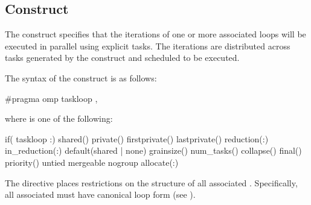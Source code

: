 \subsection{ Construct}
\label{subsec:taskloop Construct}
\summary
The  construct specifies that the iterations of one or more associated loops will be executed in parallel using explicit tasks. The iterations are distributed across tasks generated by the construct and scheduled to be executed.
\syntax
\begin{ccppspecific}
The syntax of the  construct is as follows:
\begin{ompcPragma}
#pragma omp taskloop \plc{[clause[[},\plc{] clause] ...] new-line}
\end{ompcPragma}
where  is one of the following:
\begin{indentedcodelist}
if(\plc{[} taskloop :\plc{] scalar-expression})
shared()
private()
firstprivate()
lastprivate()
reduction(:)
in_reduction(:)
default(shared \textnormal{|} none)
grainsize()
num_tasks()
collapse()
final()
priority()
untied
mergeable
nogroup
allocate(\plc{[allocator }:\plc{] list})
\end{indentedcodelist}

The  directive places restrictions on the structure of all associated . Specifically, all associated  must have canonical loop form (see ).
\end{ccppspecific}
